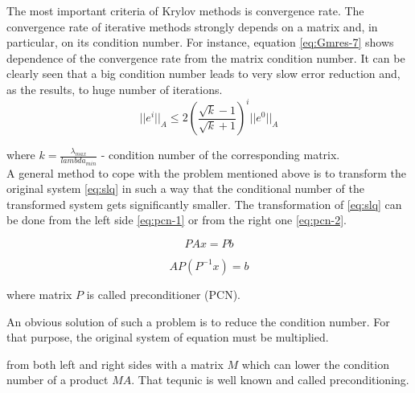 The most important criteria of Krylov methods is convergence rate. The convergence rate of iterative methods strongly depends on a matrix and, in particular, on its condition number. For instance, equation \ref{eq:Gmres-7} shows dependence of the convergence rate from the matrix condition number. It can be clearly seen that a big condition number leads to very slow error reduction and, as the results, to huge number of iterations.\\

\begin{equation} \label{eq:Gmres-7}
	|| e^i ||_A \leq 2 ( \frac{\sqrt k - 1}{\sqrt k + 1} )^i || e^0 ||_A
\end{equation}

where $k = \frac{\lambda_{max}}{lambda_{min}}$ - condition number of the corresponding matrix. \\

A general method to cope with the problem mentioned above is to transform the original system \ref{eq:slq} in such a way that the conditional number of the transformed system gets significantly smaller. The transformation of \ref{eq:slq} can be done from the left side \ref{eq:pcn-1} or from the right one \ref{eq:pcn-2}.

\begin{equation} \label{eq:pcn-1}
	PAx = Pb
\end{equation}


\begin{equation} \label{eq:pcn-2}
	AP(P^{-1}x) = b
\end{equation}

where matrix $P$ is called preconditioner (PCN).





An obvious solution of such a problem is to reduce the condition number. For that purpose, the original system of equation must be multiplied. 

from both left and right sides with a matrix $M$ which can lower the condition number of a product $MA$. That tequnic is well known and called preconditioning. 





